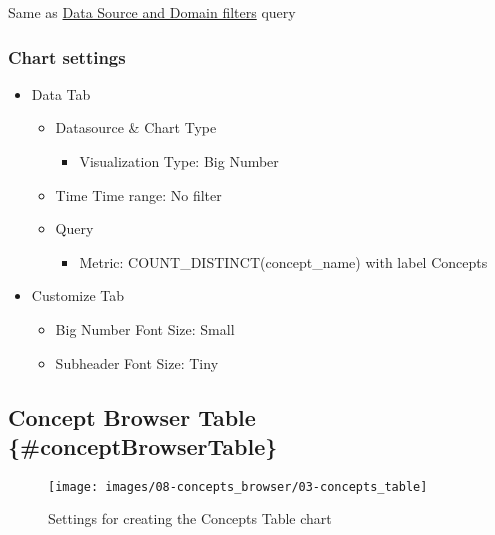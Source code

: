 \documentclass[
]{book}
\providecommand{\tightlist}{%
  \setlength{\itemsep}{0pt}\setlength{\parskip}{0pt}}
\begin{document}
Same as \protect\hyperlink{Dataux5cux2520Sourceux5cux2520andux5cux2520Domainux5cux2520Filters}{Data Source and Domain filters} query

\hypertarget{chart-settings-32}{%
\subsubsection*{Chart settings}\label{chart-settings-32}}

\begin{itemize}
\tightlist
\item
  Data Tab

  \begin{itemize}
  \tightlist
  \item
    Datasource \& Chart Type

    \begin{itemize}
    \tightlist
    \item
      Visualization Type: Big Number
    \end{itemize}
  \item
    Time
    Time range: No filter
  \item
    Query

    \begin{itemize}
    \tightlist
    \item
      Metric: COUNT\_DISTINCT(concept\_name) with label Concepts
    \end{itemize}
  \end{itemize}
\item
  Customize Tab

  \begin{itemize}
  \tightlist
  \item
    Big Number Font Size: Small
  \item
    Subheader Font Size: Tiny
  \end{itemize}
\end{itemize}

\hypertarget{concept-browser-table-conceptbrowsertable}{%
\subsection*{Concept Browser Table \{\#conceptBrowserTable\}}\label{concept-browser-table-conceptbrowsertable}}

\begin{figure}
\texttt{[image: images/08-concepts\_browser/03-concepts\_table]} \caption{Settings for creating the Concepts Table chart}\label{fig:conceptsTable}
\end{figure}
\end{document}

